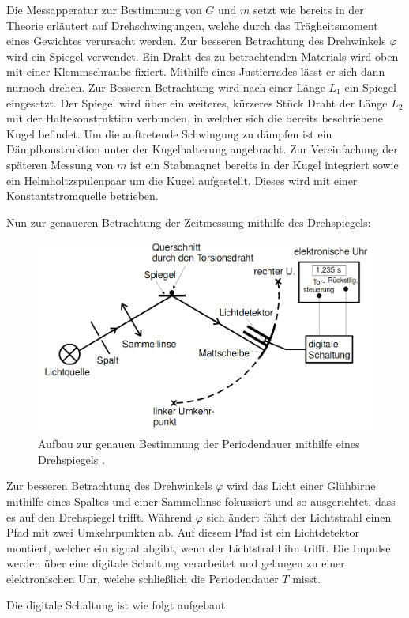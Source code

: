        Die Messapperatur zur Bestimmung von $G$ und $m$ setzt wie bereits in der
        Theorie erläutert auf Drehschwingungen, welche durch das Trägheitsmoment
        eines Gewichtes verursacht werden. Zur besseren Betrachtung des Drehwinkels
          $\varphi$ wird ein Spiegel verwendet. Ein Draht des zu betrachtenden
           Materials wird oben mit einer Klemmschraube fixiert. Mithilfe eines
           Justierrades lässt er sich dann nurnoch drehen. Zur Besseren
            Betrachtung wird nach einer Länge $L_1$ ein Spiegel eingesetzt. Der
             Spiegel wird über ein weiteres, kürzeres Stück Draht der Länge $L_2$ mit
             der Haltekonstruktion verbunden, in welcher sich die bereits
              beschriebene Kugel befindet.
               Um die auftretende Schwingung zu dämpfen ist ein Dämpfkonstruktion
                unter der Kugelhalterung angebracht. Zur Vereinfachung der späteren Messung von $m$ ist ein Stabmagnet
               bereits in der Kugel integriert sowie ein Helmholtzspulenpaar um die Kugel aufgestellt. Dieses wird
                 mit einer Konstantstromquelle betrieben.

                 Nun zur genaueren Betrachtung der Zeitmessung mithilfe des Drehspiegels:

                 \begin{figure}[H]
                          \centering
                          \includegraphics[width=\linewidth-150pt,height=\textheight-150pt,keepaspectratio]{content/Bilder/Drehspiegel.png}
                          \caption{Aufbau zur genauen Bestimmung der Periodendauer mithilfe eines Drehspiegels \cite{V102}.}
                          \label{fig:Drehspiegel}
                        \end{figure}

Zur besseren Betrachtung des Drehwinkels $\varphi$ wird das Licht einer Glühbirne
 mithilfe eines Spaltes und einer Sammellinse fokussiert und so ausgerichtet,
  dass es auf den Drehspiegel trifft. Während $\varphi$ sich ändert fährt der
   Lichtstrahl einen Pfad mit zwei Umkehrpunkten ab. Auf diesem Pfad ist ein
    Lichtdetektor montiert, welcher ein signal abgibt, wenn der Lichtstrahl
     ihn trifft. Die Impulse werden über eine digitale Schaltung verarbeitet und
      gelangen zu einer elektronischen Uhr, welche schließlich die Periodendauer $T$ misst.

      Die digitale Schaltung ist wie folgt aufgebaut:
